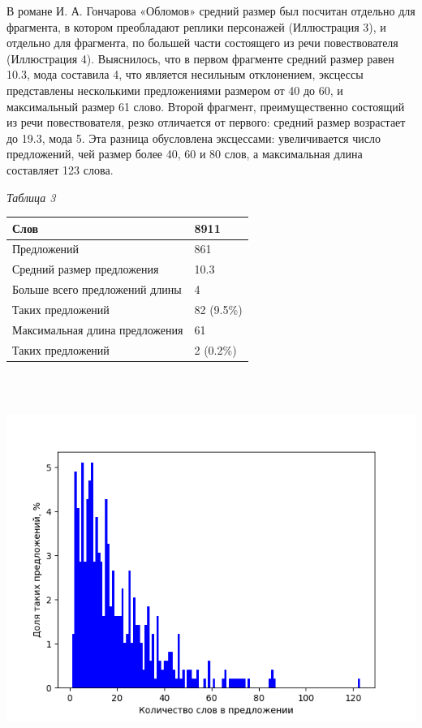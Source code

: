 \documentclass{kursa4}
\begin{document}
    {В романе И. А. Гончарова «Обломов» средний размер
    был посчитан отдельно для фрагмента, в котором преобладают реплики
    персонажей (Иллюстрация 3), и отдельно для фрагмента, по большей части
    состоящего из речи повествователя (Иллюстрация 4). Выяснилось, что в
    первом фрагменте средний размер равен 10.3, мода составила 4, что
    является несильным отклонением, эксцессы представлены несколькими
    предложениями размером от 40 до 60, и максимальный размер 61 слово.
    Второй фрагмент, преимущественно состоящий из речи повествователя,
    резко отличается от первого: средний размер возрастает до 19.3, мода 5.
    Эта разница обусловлена эксцессами: }{увеличивается
    число предложений, чей размер более 40, 60 и 80 слов, а максимальная
    длина составляет 123 слова. }

    {\centering
    \textit{{Таблица 3}}
    \par}

    \begin{center}
    \tablehead{}
    \begin{supertabular}{|m{5.7730002cm}|m{1.6559999cm}|}
    \hline
    Слов &
    8911\\\hline
    Предложений &
    861\\\hline
    Средний размер предложения &
    10.3\\\hline
    Больше всего предложений длины &
    4\\\hline
    Таких предложений &
    82 (9.5\%)\\\hline
    Максимальная длина предложения &
    61\\\hline
    Таких предложений &
    2 (0.2\%)\\\hline
    \end{supertabular}
    \end{center}
     \includegraphics[width=16.933cm,height=12.7cm]{irmw2lnohyper-img3.png} 
\end{document}

